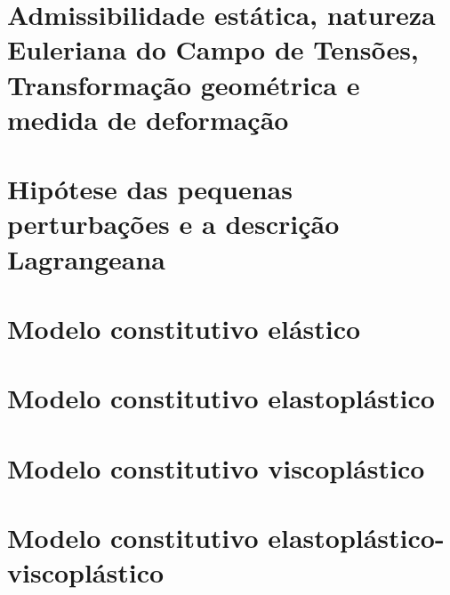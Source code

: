 \section{Admissibilidade estática, natureza Euleriana do Campo de Tensões, Transformação geométrica e medida de deformação}

\section{Hipótese das pequenas perturbações e a descrição Lagrangeana}

\section{Modelo constitutivo elástico}

\section{Modelo constitutivo elastoplástico}

\section{Modelo constitutivo viscoplástico}


\section{Modelo constitutivo elastoplástico-viscoplástico}







